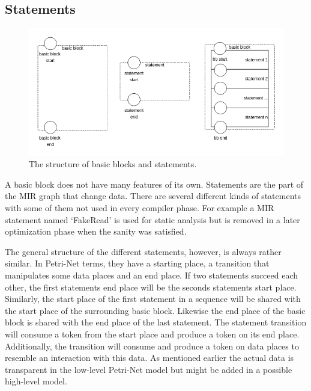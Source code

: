 \subsection{Statements}
\begin{figure}
    \centering
    \includegraphics[width=.9\textwidth]{../diagrams/basic_blocks.png}
    \caption{
        The structure of basic blocks and statements.
    }
    \label{basic_block_trans}
\end{figure}
A basic block does not have many features of its own.
Statements are the part of the MIR graph that change data.
There are several different kinds of statements with some of them not used in every compiler phase.
For example a MIR statement named `FakeRead' is used for static analysis but is removed in a later optimization phase when the sanity was satisfied.

The general structure of the different statements, however, is always rather similar.
In Petri-Net terms, they have a starting place, a transition that manipulates some data places and an end place.
If two statements succeed each other, the first statements end place will be the seconds statements start place.
Similarly, the start place of the first statement in a sequence will be shared with the start place of the surrounding basic block.
Likewise the end place of the basic block is shared with the end place of the last statement.
The statement transition will consume a token from the start place and produce a token on its end place.
Additionally, the transition will consume and produce a token on data places to resemble an interaction with this data.
As mentioned earlier the actual data is transparent in the low-level Petri-Net model but might be added in a possible high-level model.


